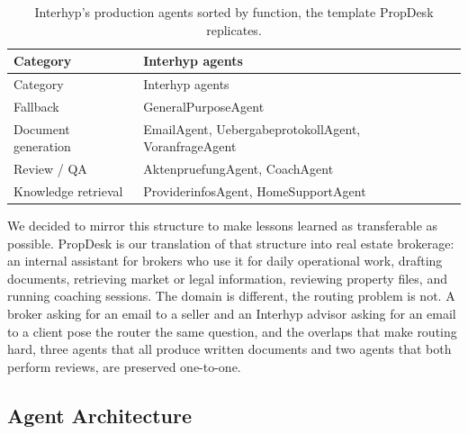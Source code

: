 \begin{longtable}[]{@{}
  >{\raggedright\arraybackslash}p{}
  >{\raggedright\arraybackslash}p{}@{}}
\caption{Interhyp's production agents sorted by function, the template PropDesk replicates.}\label{tbl:interhyp-agent-categories}\tabularnewline
\toprule\noalign{}
\begin{minipage}[b]{\linewidth}\raggedright
Category
\end{minipage} & \begin{minipage}[b]{\linewidth}\raggedright
Interhyp agents
\end{minipage} \\
\midrule\noalign{}
\endfirsthead
\toprule\noalign{}
\begin{minipage}[b]{\linewidth}\raggedright
Category
\end{minipage} & \begin{minipage}[b]{\linewidth}\raggedright
Interhyp agents
\end{minipage} \\
\midrule\noalign{}
\endhead
\bottomrule\noalign{}
\endlastfoot
Fallback & GeneralPurposeAgent \\
Document generation & EmailAgent, UebergabeprotokollAgent, VoranfrageAgent \\
Review / QA & AktenpruefungAgent, CoachAgent \\
Knowledge retrieval & ProviderinfosAgent, HomeSupportAgent \\
\end{longtable}

We decided to mirror this structure to make lessons learned as transferable as possible. PropDesk is our translation of that structure into real estate brokerage: an internal assistant for brokers who use it for daily operational work, drafting documents, retrieving market or legal information, reviewing property files, and running coaching sessions. The domain is different, the routing problem is not. A broker asking for an email to a seller and an Interhyp advisor asking for an email to a client pose the router the same question, and the overlaps that make routing hard, three agents that all produce written documents and two agents that both perform reviews, are preserved one-to-one.

\subsection{Agent Architecture}\label{sec:agent-architecture}

